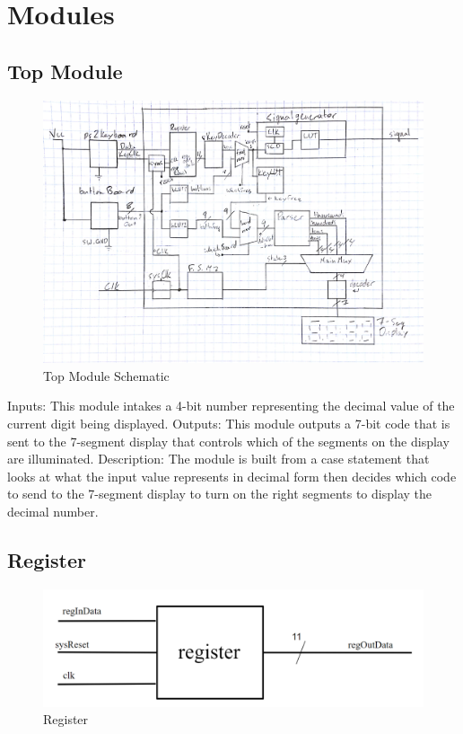\documentclass[a4paper]{article}
\begin{document}
\section{Modules}

\subsection{Top Module}

\begin{figure}
    \includegraphics[width=5.5in]{Images/topLevelSchematic.jpg}
    \caption{Top Module Schematic}
    \label{fig:4}
\end{figure}

Inputs: This module intakes a 4-bit number representing the decimal value of the current digit being displayed.
\newline\newline
Outputs: This module outputs a 7-bit code that is sent to the 7-segment display that controls which of the segments on the display are illuminated.
\newline\newline
Description: The module is built from a case statement that looks at what the input value represents in decimal form then decides which code to send to the 7-segment display to turn on the right segments to display the decimal number.


\subsection{Register}

\begin{figure}[h]
    \includegraphics[width=6in]{./Images/DiagramsYang/register.png}
    \caption{Register}
    \label{fig:5}
\end{figure}
\end{document}
